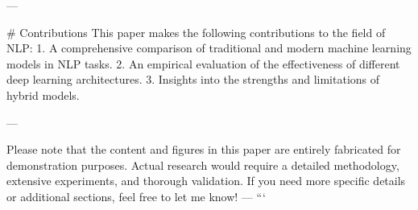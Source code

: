 ---

# Contributions
This paper makes the following contributions to the field of NLP:
1. A comprehensive comparison of traditional and modern machine learning models in NLP tasks.
2. An empirical evaluation of the effectiveness of different deep learning architectures.
3. Insights into the strengths and limitations of hybrid models.

---

Please note that the content and figures in this paper are entirely fabricated for demonstration purposes. Actual research would require a detailed methodology, extensive experiments, and thorough validation. If you need more specific details or additional sections, feel free to let me know! --- ```
